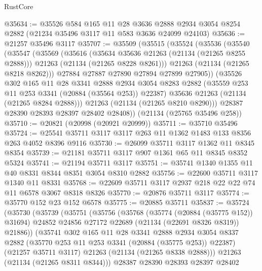 \begin{lexlean}{RustCore}
\begin{coremodule}
@35634 := @35526
    @584
    @165
    @11
    @28
    @3636
    @2888
    @2934
    @3054
    @8254
    @2882
    (@21234 @35496 @3117 @11 @583 @3636 @24099 @24103)
@35636 := @21257 @35496 @3117
@35707 := @35509
    (@35515
      (@35524
        (@35536
          (@35540
            (@35547
              (@35569
                (@35616
                  (@35634 @35636 @21263 (@21134 (@21265 @8255 @2888)))
                  @21263
                  (@21134 (@21265 @8228 @8261)))
                @21263
                (@21134 (@21265 @8218 @8262)))
              @27884
              @27887
              @27890
              @27894
              @27899
              @27905))
          (@35526
            @302
            @165
            @11
            @28
            @3341
            @2888
            @2934
            @3054
            @8283
            @2882
            (@35559 @253 @11 @253 @3341 (@20884 (@35564 @253)) @22387)
            @35636
            @21263
            (@21134 (@21265 @8284 @2888)))
          @21263
          (@21134 (@21265 @8210 @8290)))
        @28387
        @28390
        @28393
        @28397
        @28402
        @28408))
    (@21134 (@25765 @35496 @258))
@35710 := @20821 (@20998 (@20921 @20999))
@35711 := @35710 @35496
@35724 := @25541 @35711 @3117 @3117 @263 @11 @1362 @1483 @133 @8356 @263 @4052 @8396 @9116
@35730 := @26099 @35711 @3117 @1362 @11 @8345 @8354
@35739 := @21181 @35711 @3117 @907 @1361 @65 @11 @8345 @8352 @5324
@35741 := @21194 @35711 @3117
@35751 := @35741 @1340 @1355 @11 @40 @8331 @8344 @8351 @3054 @8310 @2882
@35756 := @22600 @35711 @3117 @1340 @11 @8331
@35768 := @22609 @35711 @3117 @2937 @218 @22 @22 @74 @11 @6578 @3067 @8318 @8326
@35770 := @20876 @35711 @3117
@35774 := @35770 @152 @23 @152 @6578
@35775 := @20885 @35711
@35837 := @35724
    (@35730
      (@35739
        (@35751
          (@35756
            (@35768
              (@35774 (@20884 (@35775 @152)) @31694)
              @24852
              @24856
              @27172
              @22689
              (@21134 (@22691 @8326 @8319))
              @21886))
          (@35741
            @302
            @165
            @11
            @28
            @3341
            @2888
            @2934
            @3054
            @8337
            @2882
            (@35770 @253 @11 @253 @3341 (@20884 (@35775 @253)) @22387)
            (@21257 @35711 @3117)
            @21263
            (@21134 (@21265 @8338 @2888)))
          @21263
          (@21134 (@21265 @8311 @8344)))
        @28387
        @28390
        @28393
        @28397
        @28402

\end{coremodule}
\end{lexlean}
